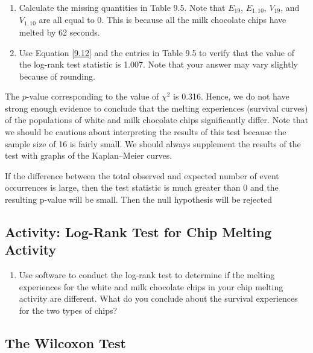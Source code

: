 \documentclass[
]{book}
\providecommand{\tightlist}{%
  \setlength{\itemsep}{0pt}\setlength{\parskip}{0pt}}
\begin{document}
\begin{enumerate}
\def\labelenumi{\arabic{enumi}.}
\setcounter{enumi}{33}
\tightlist
\item
  Calculate the missing quantities in Table 9.5. Note that \(E_{19}\), \(E_{1,10}\), \(V_{19}\), and \(V_{1,10}\) are all equal to 0. This is because all the milk chocolate chips have melted by 62 seconds.\\
\item
  Use Equation \ref{9.12} and the entries in Table 9.5 to verify that the value of the log-rank test statistic is 1.007. Note that your answer may vary slightly because of rounding.
\end{enumerate}

The \(p\)-value corresponding to the value of \(\chi^2\) is 0.316. Hence, we do not have strong enough evidence to conclude that the melting experiences (survival curves) of the populations of white and milk chocolate chips significantly differ. Note that we should be cautious about interpreting the results of this test because the sample size of 16 is fairly small. We should always supplement the results of the test with graphs of the Kaplan--Meier curves.

If the difference between the total observed and expected number of event occurrences is large, then the
test statistic is much greater than 0 and the resulting p-value will be small. Then the null hypothesis will be
rejected

\hypertarget{activity-log-rank-test-for-chip-melting-activity}{%
\subsection*{Activity: Log-Rank Test for Chip Melting Activity}\label{activity-log-rank-test-for-chip-melting-activity}}

\begin{enumerate}
\def\labelenumi{\arabic{enumi}.}
\setcounter{enumi}{35}
\tightlist
\item
  Use software to conduct the log-rank test to determine if the melting experiences for the white and milk chocolate chips in your chip melting activity are different. What do you conclude about the survival experiences for the two types of chips?
\end{enumerate}

\hypertarget{the-wilcoxon-test}{%
\subsection*{The Wilcoxon Test}\label{the-wilcoxon-test}}
\end{document}

